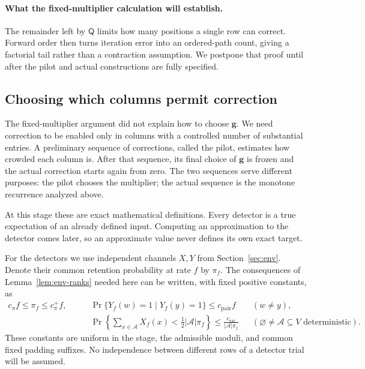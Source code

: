 \documentclass[11pt]{article}
\numberwithin{equation}{section}
\theoremstyle{definition}
\theoremstyle{remark}
\begin{document}
\paragraph{What the fixed-multiplier calculation will establish.}
The remainder left by ${\mathsf{Q}}$ limits how many positions a single row can correct. Forward order then turns iteration error into an ordered-path count, giving a factorial tail rather than a contraction assumption. We postpone that proof until after the pilot and actual constructions are fully specified.

\subsection{Choosing which columns permit correction}

The fixed-multiplier argument did not explain how to choose ${\mathbf{g}}$. We need correction to be enabled only in columns with a controlled number of substantial entries. A preliminary sequence of corrections, called the pilot, estimates how crowded each column is. After that sequence, its final choice of ${\mathbf{g}}$ is frozen and the actual correction starts again from zero. The two sequences serve different purposes: the pilot chooses the multiplier; the actual sequence is the monotone recurrence analyzed above.

At this stage these are exact mathematical definitions. Every detector is a true expectation of an already defined input. Computing an approximation to the detector comes later, so an approximate value never defines its own exact target.

For the detectors we use independent channels $X,Y$ from
Section~\ref{sec:env}.  Denote their common retention probability at rate
$f$ by $\pi_f$.  The consequences of Lemma~\ref{lem:env-ranks} needed here
can be written, with fixed positive constants, as
\begin{align}
 c_\pi f\leq\pi_f\leq {c_\pi^+} f,\qquad
 &\Pr\{Y_f(w)=1\mid Y_f(y)=1\}\leq {c}_{\mathrm{pair}} f
       &&(w\ne y), \label{eq:hier-sampling-pair}\\
 &\Pr\left\{\sum_{x\in {\mathcal{A}}}X_f(x)<\tfrac12|{\mathcal{A}}|\pi_f\right\}
       \leq\frac{{c}_{\mathrm{var}}}{|{\mathcal{A}}|\pi_f}
       &&(\varnothing\ne {\mathcal{A}}\subseteq V\text{ deterministic}).
       \label{eq:hier-sampling-tail}
\end{align}
These constants are uniform in the stage, the admissible moduli, and common
fixed padding suffixes.  No independence between different rows of a
detector trial will be assumed.
\end{document}
